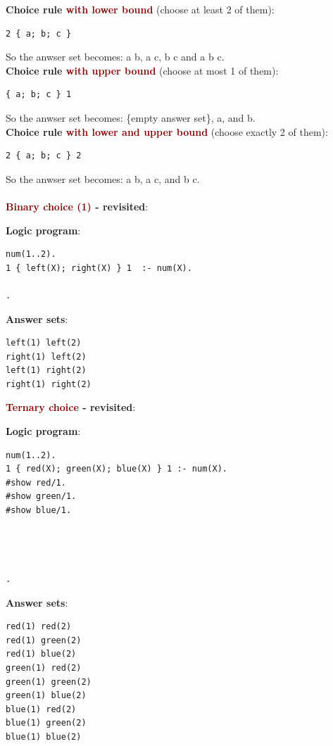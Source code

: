 \vspace{0.35cm}

\textbf{Choice rule \textcolor{Maroon}{with lower bound}} (choose at least 2 of them): 
\begin{lstlisting}
2 { a; b; c }
\end{lstlisting}
So the anwser set becomes: a b, a c, b c and a b c.\\

\textbf{Choice rule \textcolor{Maroon}{with upper bound}} (choose at most 1 of them): 
\begin{lstlisting}
{ a; b; c } 1
\end{lstlisting}
So the anwser set becomes: \{empty answer set\}, a, and b. \\

\textbf{Choice rule \textcolor{Maroon}{with lower and upper bound}} (choose exactly 2 of them): 
\begin{lstlisting}
2 { a; b; c } 2
\end{lstlisting}
So the anwser set becomes: a b, a c, and b c. \\
\\

{\Large \textbf{\textcolor{Maroon}{Binary choice (1)} - revisited}}: \\
\begin{minipage}{0.7\textwidth}
\textbf{Logic program}:
\begin{lstlisting}
num(1..2).
1 { left(X); right(X) } 1  :- num(X).

.
\end{lstlisting}
\end{minipage}
\begin{minipage}{0.3\textwidth}
\textbf{Answer sets}:
\begin{lstlisting}
left(1) left(2)
right(1) left(2)
left(1) right(2)
right(1) right(2)
\end{lstlisting}
\end{minipage}

\vspace{0.35cm}

{\Large \textbf{\textcolor{Maroon}{Ternary choice} - revisited}}: \\
\begin{minipage}{0.7\textwidth}
\textbf{Logic program}:
\begin{lstlisting}
num(1..2).
1 { red(X); green(X); blue(X) } 1 :- num(X).
#show red/1. 
#show green/1. 
#show blue/1.




.
\end{lstlisting}
\end{minipage}
\begin{minipage}{0.3\textwidth}
\textbf{Answer sets}:
\begin{lstlisting}
red(1) red(2)
red(1) green(2)
red(1) blue(2)
green(1) red(2)
green(1) green(2)
green(1) blue(2)
blue(1) red(2)
blue(1) green(2)
blue(1) blue(2)
\end{lstlisting}
\end{minipage}

